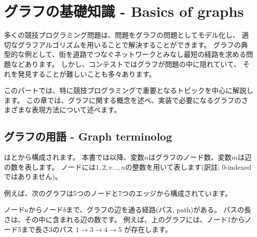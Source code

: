 \chapter{グラフの基礎知識 - Basics of graphs}

多くの競技プログラミング問題は、問題をグラフの問題としてモデル化し、
適切なグラフアルゴリズムを用いることで解決することができます。
グラフの典型的な例として、街を道路でつなぐネットワークとみなし最短の経路を求める問題などあります。
しかし、コンテストではグラフが問題の中に隠れていて、
それを発見することが難しいことも多々あります。

このパートでは、特に競技プログラミングで重要となるトピックを中心に解説します。
この章では、グラフに関する概念を述べ、実装で必要になるグラフのさまざまな表現方法について述べます。

\section{グラフの用語 - Graph terminolog}


はとから構成されます。
本書では以降、変数$n$はグラフのノード数、変数$m$は辺の数を表します。
ノードには$1,2,v \ldots ,n$の整数を用いて表します(訳註: 0-indexedではありません)。

例えば、次のグラフは5つのノードと7つのエッジから構成されています。

\begin{center}
\end{center}


ノード$a$からノード$b$まで、グラフの辺を通る経路(パス, path)がある。
パスの長さは、その中に含まれる辺の数です。
例えば、上のグラフには、ノード1からノード5まで長さ3のパス
 $1 \rightarrow 3 \rightarrow 4 \rightarrow 5$
 が存在します。

